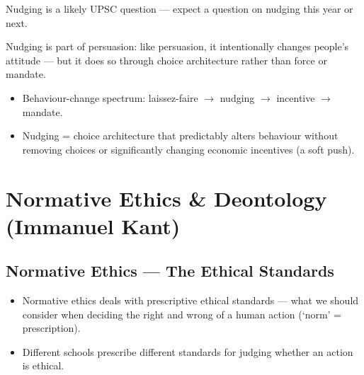 \begin{PYQLink}
Nudging is a likely UPSC question --- expect a question on nudging this year or next.
\end{PYQLink}

\begin{CriticalPoint}
Nudging is part of persuasion: like persuasion, it intentionally changes people's attitude --- but it does so through choice architecture rather than force or mandate.
\end{CriticalPoint}

\begin{QuickRevision}
\begin{itemize}
\item Behaviour-change spectrum: laissez-faire $\rightarrow$ nudging $\rightarrow$ incentive $\rightarrow$ mandate.
\item Nudging = choice architecture that predictably alters behaviour without removing choices or significantly changing economic incentives (a soft push).
\end{itemize}
\end{QuickRevision}

\section{Normative Ethics \& Deontology (Immanuel Kant)}

\subsection{Normative Ethics --- The Ethical Standards}

\begin{KeyConcept}
\begin{itemize}
\item Normative ethics deals with prescriptive ethical standards --- what we should consider when deciding the right and wrong of a human action (`norm' = prescription).
\item Different schools prescribe different standards for judging whether an action is ethical.
\end{itemize}
\end{KeyConcept}

